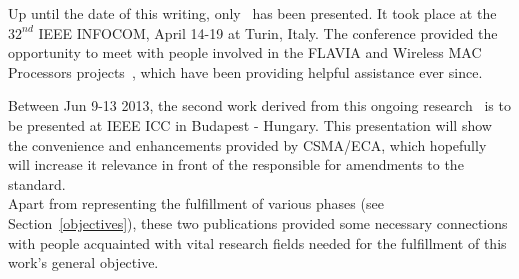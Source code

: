 Up until the date of this writing, only~\cite{fairness-ECA} has been presented. It took place at the $32^{nd}$ IEEE INFOCOM, April 14-19 at Turin, Italy. The conference provided the opportunity to meet with people involved in the FLAVIA and Wireless MAC Processors projects~\cite{FLAVIA,WMP}, which have been providing helpful assistance ever since. 

Between Jun 9-13 2013, the second work derived from this ongoing research~\cite{research2standards} is to be presented at IEEE ICC in Budapest - Hungary. This presentation will show the convenience and enhancements provided by CSMA/ECA, which hopefully will increase it relevance in front of the responsible for amendments to the standard.\\

Apart from representing the fulfillment of various phases (see Section~\ref{objectives}), these two publications provided some necessary connections with people acquainted with vital research fields needed for the fulfillment of this work's general objective.